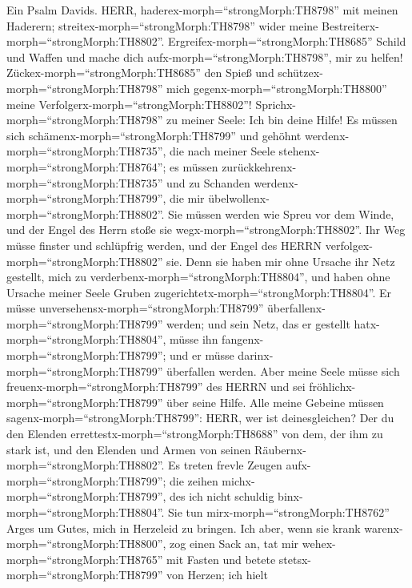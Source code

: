  Ein Psalm Davids. HERR,
haderex-morph=``strongMorph:TH8798'' mit meinen Haderern;
streitex-morph=``strongMorph:TH8798'' wider meine
Bestreiterx-morph=``strongMorph:TH8802''. 
Ergreifex-morph=``strongMorph:TH8685'' Schild und Waffen und mache dich
aufx-morph=``strongMorph:TH8798'', mir zu helfen! 
Zückex-morph=``strongMorph:TH8685'' den Spieß und
schützex-morph=``strongMorph:TH8798'' mich
gegenx-morph=``strongMorph:TH8800'' meine
Verfolgerx-morph=``strongMorph:TH8802''!
Sprichx-morph=``strongMorph:TH8798'' zu meiner Seele: Ich bin deine
Hilfe!  Es müssen sich schämenx-morph=``strongMorph:TH8799''
und gehöhnt werdenx-morph=``strongMorph:TH8735'', die nach meiner Seele
stehenx-morph=``strongMorph:TH8764''; es müssen
zurückkehrenx-morph=``strongMorph:TH8735'' und zu Schanden
werdenx-morph=``strongMorph:TH8799'', die mir
übelwollenx-morph=``strongMorph:TH8802''.  Sie müssen werden
wie Spreu vor dem Winde, und der Engel des Herrn stoße sie
wegx-morph=``strongMorph:TH8802''.  Ihr Weg müsse finster
und schlüpfrig werden, und der Engel des HERRN
verfolgex-morph=``strongMorph:TH8802'' sie.  Denn sie haben
mir ohne Ursache ihr Netz gestellt, mich zu
verderbenx-morph=``strongMorph:TH8804'', und haben ohne Ursache meiner
Seele Gruben zugerichtetx-morph=``strongMorph:TH8804''.  Er
müsse unversehensx-morph=``strongMorph:TH8799''
überfallenx-morph=``strongMorph:TH8799'' werden; und sein Netz, das er
gestellt hatx-morph=``strongMorph:TH8804'', müsse ihn
fangenx-morph=``strongMorph:TH8799''; und er müsse
darinx-morph=``strongMorph:TH8799'' überfallen werden.  Aber
meine Seele müsse sich freuenx-morph=``strongMorph:TH8799'' des HERRN
und sei fröhlichx-morph=``strongMorph:TH8799'' über seine Hilfe.
 Alle meine Gebeine müssen
sagenx-morph=``strongMorph:TH8799'': HERR, wer ist deinesgleichen? Der
du den Elenden errettestx-morph=``strongMorph:TH8688'' von dem, der ihm
zu stark ist, und den Elenden und Armen von seinen
Räubernx-morph=``strongMorph:TH8802''.  Es treten frevle
Zeugen aufx-morph=``strongMorph:TH8799''; die zeihen
michx-morph=``strongMorph:TH8799'', des ich nicht schuldig
binx-morph=``strongMorph:TH8804''.  Sie tun
mirx-morph=``strongMorph:TH8762'' Arges um Gutes, mich in Herzeleid zu
bringen.  Ich aber, wenn sie krank
warenx-morph=``strongMorph:TH8800'', zog einen Sack an, tat mir
wehex-morph=``strongMorph:TH8765'' mit Fasten und betete
stetsx-morph=``strongMorph:TH8799'' von Herzen;  ich hielt
